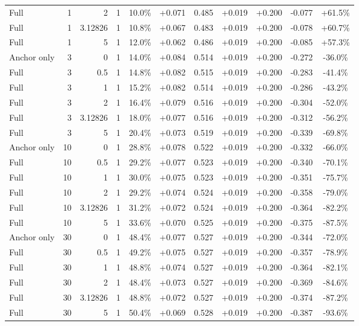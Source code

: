 \begin{table}[htbp]
\begin{tabular}{lrrrccccccc}
Full & 1 & 2 & 1 & 10.0\% & +0.071 & 0.485 & +0.019 & +0.200 & -0.077 & +61.5\% \\
Full & 1 & 3.12826 & 1 & 10.8\% & +0.067 & 0.483 & +0.019 & +0.200 & -0.078 & +60.7\% \\
Full & 1 & 5 & 1 & 12.0\% & +0.062 & 0.486 & +0.019 & +0.200 & -0.085 & +57.3\% \\
Anchor only & 3 & 0 & 1 & 14.0\% & +0.084 & 0.514 & +0.019 & +0.200 & -0.272 & -36.0\% \\
Full & 3 & 0.5 & 1 & 14.8\% & +0.082 & 0.515 & +0.019 & +0.200 & -0.283 & -41.4\% \\
Full & 3 & 1 & 1 & 15.2\% & +0.082 & 0.514 & +0.019 & +0.200 & -0.286 & -43.2\% \\
Full & 3 & 2 & 1 & 16.4\% & +0.079 & 0.516 & +0.019 & +0.200 & -0.304 & -52.0\% \\
Full & 3 & 3.12826 & 1 & 18.0\% & +0.077 & 0.516 & +0.019 & +0.200 & -0.312 & -56.2\% \\
Full & 3 & 5 & 1 & 20.4\% & +0.073 & 0.519 & +0.019 & +0.200 & -0.339 & -69.8\% \\
Anchor only & 10 & 0 & 1 & 28.8\% & +0.078 & 0.522 & +0.019 & +0.200 & -0.332 & -66.0\% \\
Full & 10 & 0.5 & 1 & 29.2\% & +0.077 & 0.523 & +0.019 & +0.200 & -0.340 & -70.1\% \\
Full & 10 & 1 & 1 & 30.0\% & +0.075 & 0.523 & +0.019 & +0.200 & -0.351 & -75.7\% \\
Full & 10 & 2 & 1 & 29.2\% & +0.074 & 0.524 & +0.019 & +0.200 & -0.358 & -79.0\% \\
Full & 10 & 3.12826 & 1 & 31.2\% & +0.072 & 0.524 & +0.019 & +0.200 & -0.364 & -82.2\% \\
Full & 10 & 5 & 1 & 33.6\% & +0.070 & 0.525 & +0.019 & +0.200 & -0.375 & -87.5\% \\
Anchor only & 30 & 0 & 1 & 48.4\% & +0.077 & 0.527 & +0.019 & +0.200 & -0.344 & -72.0\% \\
Full & 30 & 0.5 & 1 & 49.2\% & +0.075 & 0.527 & +0.019 & +0.200 & -0.357 & -78.9\% \\
Full & 30 & 1 & 1 & 48.8\% & +0.074 & 0.527 & +0.019 & +0.200 & -0.364 & -82.1\% \\
Full & 30 & 2 & 1 & 48.4\% & +0.073 & 0.527 & +0.019 & +0.200 & -0.369 & -84.6\% \\
Full & 30 & 3.12826 & 1 & 48.8\% & +0.072 & 0.527 & +0.019 & +0.200 & -0.374 & -87.2\% \\
Full & 30 & 5 & 1 & 50.4\% & +0.069 & 0.528 & +0.019 & +0.200 & -0.387 & -93.6\% \\

\end{tabular}
\end{table}
